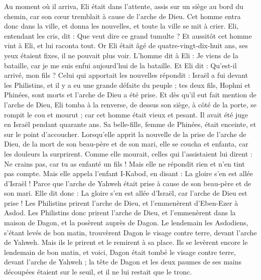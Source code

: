 \begin{multicols}{2}
Au moment où il arriva, Eli était dans l'attente, assis sur un siège au bord du chemin, car son cœur tremblait à cause de l'arche de Dieu. Cet homme entra donc dans la ville, et donna les nouvelles, et toute la ville se mit à crier.
Eli, entendant les cris, dit : Que veut dire ce grand tumulte ? Et aussitôt cet homme vint à Eli, et lui raconta tout.
Or Eli était âgé de quatre-vingt-dix-huit ans, ses yeux étaient fixes, il ne pouvait plus voir.
L'homme dit à Eli : Je viens de la bataille, car je me suis enfui aujourd'hui de la bataille. Et Eli dit : Qu'est-il arrivé, mon fils ?
Celui qui apportait les nouvelles répondit : Israël a fui devant les Philistins, et il y a eu une grande défaite du peuple ; tes deux fils, Hophni et Phinées, sont morts et l'arche de Dieu a été prise.
Et dès qu'il eut fait mention de l'arche de Dieu, Eli tomba à la renverse, de dessus son siège, à côté de la porte, se rompit le cou et mourut ; car cet homme était vieux et pesant. Il avait été juge en Israël pendant quarante ans.
Sa belle-fille, femme de Phinées, était enceinte, et sur le point d'accoucher. Lorsqu'elle apprit la nouvelle de la prise de l'arche de Dieu, de la mort de son beau-père et de son mari, elle se coucha et enfanta, car les douleurs la surprirent.
Comme elle mourait, celles qui l'assistaient lui dirent : Ne crains pas, car tu as enfanté un fils ! Mais elle ne répondit rien et n'en tint pas compte.
Mais elle appela l'enfant I-Kabod, en disant : La gloire s'en est allée d'Israël ! Parce que l'arche de Yahweh était prise à cause de son beau-père et de son mari.
Elle dit donc : La gloire s'en est allée d'Israël, car l'arche de Dieu est prise !
\VerseOne{}Les Philistins prirent l'arche de Dieu, et l'emmenèrent d'Eben-Ezer à Asdod.
Les Philistins donc prirent l'arche de Dieu, et l'emmenèrent dans la maison de Dagon, et la posèrent auprès de Dagon.
Le lendemain les Asdodiens, s'étant levés de bon matin, trouvèrent Dagon le visage contre terre, devant l'arche de Yahweh. Mais ils le prirent et le remirent à sa place.
Ils se levèrent encore le lendemain de bon matin, et voici, Dagon était tombé le visage contre terre, devant l'arche de Yahweh ; la tête de Dagon et les deux paumes de ses mains découpées étaient sur le seuil, et il ne lui restait que le tronc.

\end{multicols}
